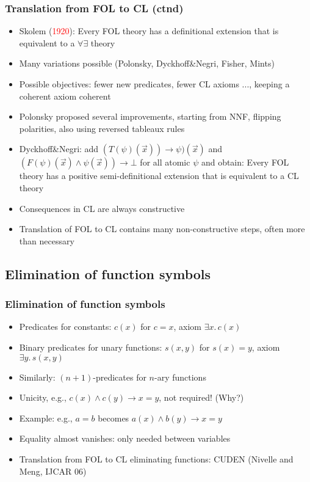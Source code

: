 \documentclass[handout,11pt]{beamer}
\newcommand{\red}[1]{\textcolor{red}{#1}}
\begin{document}
\begin{frame}
\frametitle{Translation from FOL to CL (ctnd)}
 \begin{itemize}[<+->]
   \item Skolem (\red{1920}): Every FOL theory has a definitional 
   extension that is equivalent to a $\forall\exists$ theory
   \item Many variations possible (Polonsky, Dyckhoff\&Negri, Fisher, Mints)
   \item Possible objectives: fewer new predicates, fewer CL axioms ...,
   keeping a coherent axiom coherent
   \item Polonsky proposed several improvements, starting from NNF,
   flipping polarities, also using reversed tableaux rules
   \item Dyckhoff\&Negri: add $(T(\psi)(\vec{x})) \to \psi)(\vec{x})$ 
   and $(F(\psi)(\vec{x})\wedge \psi(\vec{x})) \to \bot$
   for all atomic $\psi$ and obtain:
   Every FOL theory has a positive semi-definitional extension 
   that is equivalent to a CL theory
   \item Consequences in CL are always constructive
   \item Translation of FOL to CL contains many non-constructive steps,
   often more than necessary
 \end{itemize}
\end{frame}
 
\subsection{Elimination of function symbols}

\begin{frame}
\frametitle{Elimination of function symbols}
 \begin{itemize}[<+->]
    \item Predicates for constants: $c(x)$ for $c=x$, axiom $\exists x.\,c(x)$
    \item Binary predicates for unary functions: $s(x,y)$ for $s(x)=y$, axiom $\exists y.\,s(x,y)$
    \item Similarly: $(n{+}1)$-predicates for $n$-ary functions
    \item Unicity, e.g., $c(x)\land c(y)\to x=y$, \alert{not} required! (Why?)
    \item Example: e.g., $a=b$ becomes $a(x) \land b(y) \to x=y$
    \item Equality almost vanishes: only needed between variables
    \item Translation from FOL to CL eliminating functions: CUDEN (Nivelle and Meng, IJCAR 06)
 \end{itemize}
\end{frame}
\end{document}
